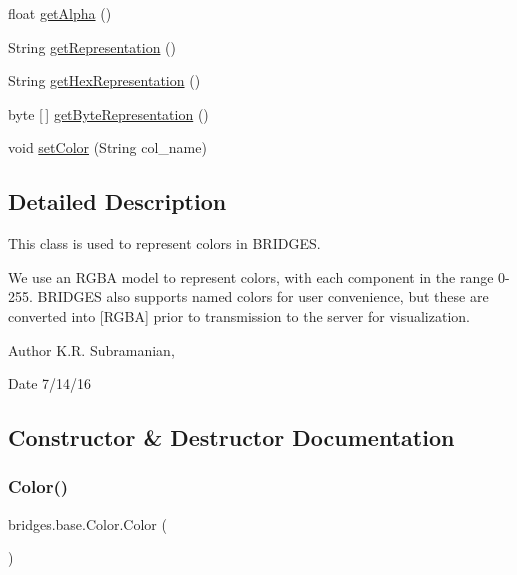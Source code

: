 \begin{DoxyCompactItemize}
\item 
float \mbox{\hyperlink{classbridges_1_1base_1_1_color_a7c4247e31ecd8fcc61ef208d5deefe68}{get\+Alpha}} ()
\item 
String \mbox{\hyperlink{classbridges_1_1base_1_1_color_a2f9b0cb588e49b2ebf2f015d4d7507d0}{get\+Representation}} ()
\item 
String \mbox{\hyperlink{classbridges_1_1base_1_1_color_aced9bc89248b85686ba5385472974fe6}{get\+Hex\+Representation}} ()
\item 
byte \mbox{[}$\,$\mbox{]} \mbox{\hyperlink{classbridges_1_1base_1_1_color_a07215c888a6d17374a3d862ff30d5f93}{get\+Byte\+Representation}} ()
\item 
void \mbox{\hyperlink{classbridges_1_1base_1_1_color_a54dcd31227bde0f5d0a4f5d3b5a24ed2}{set\+Color}} (String col\+\_\+name)
\end{DoxyCompactItemize}


\subsection{Detailed Description}
This class is used to represent colors in B\+R\+I\+D\+G\+ES. 

We use an R\+G\+BA model to represent colors, with each component in the range 0-\/255. B\+R\+I\+D\+G\+ES also supports named colors for user convenience, but these are converted into \mbox{[}R\+G\+BA\mbox{]} prior to transmission to the server for visualization.

\begin{DoxyAuthor}{Author}
K.\+R. Subramanian, 
\end{DoxyAuthor}
\begin{DoxyDate}{Date}
7/14/16 
\end{DoxyDate}


\subsection{Constructor \& Destructor Documentation}
\mbox{\label{classbridges_1_1base_1_1_color_ab6d71ac2ee1430fb2db2fbe34e692de8}} 
\subsubsection{\texorpdfstring{Color()}{Color()}\hspace{0.1cm}{\footnotesize\ttfamily [1/4]}}
{\footnotesize\ttfamily bridges.\+base.\+Color.\+Color (\begin{DoxyParamCaption}{ }\end{DoxyParamCaption})}

